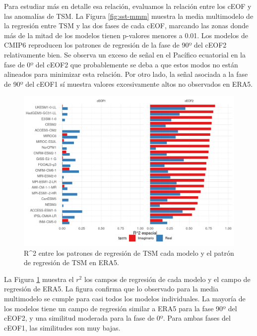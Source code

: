 \documentclass[12pt,oneside]{reedthesis}
\begin{document}
Para estudiar más en detalle esa relación, evaluamos la relación entre los cEOF y las anomalías de TSM.
La Figura \ref{fig:sst-mmm} muestra la media multimodelo de la regresión entre TSM y las dos fases de cada cEOF, marcando las zonas donde más de la mitad de los modelos tienen p-valores menores a 0.01.
Los modelos de CMIP6 reproducen los patrones de regresión de la fase de 90º del cEOF2 relativamente bien.
Se observa un exceso de señal en el Pacífico ecuatorial en la fase de 0º del cEOF2 que probablemente se deba a que estos modos no están alineados para minimizar esta relación.
Por otro lado, la señal asociada a la fase de 90º del cEOF1 sí muestra valores excesivamente altos no observados en ERA5.



\begin{figure}
\includegraphics{figures/50-cmip6/cor-sst-regr-1} \caption{R\^{}2 entre los patrones de regresión de TSM cada modelo y el patrón de regresión de TSM en ERA5.}\label{fig:cor-sst-regr}
\end{figure}

La Figura \ref{fig:cor-sst-regr} muestra el \(r^2\) los campos de regresión de cada modelo y el campo de regresión de ERA5.
La figura confirma que lo observado para la media multimodelo se cumple para casi todos los modelos individuales.
La mayoría de los modelos tiene un campo de regresión similar a ERA5 para la fase 90º del cEOF2, y una similitud moderada para la fase de 0º.
Para ambas fases del cEOF1, las similitudes son muy bajas.
\end{document}
